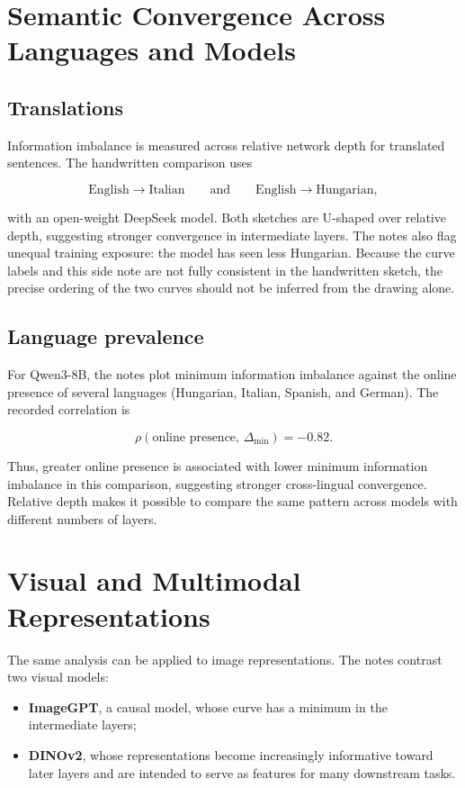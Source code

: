 \documentclass[11pt,a4paper]{article}
\begin{document}
\section{Semantic Convergence Across Languages and Models}

\subsection{Translations}

Information imbalance is measured across relative network depth for translated
sentences. The handwritten comparison uses

\[
  \text{English} \longrightarrow \text{Italian}
  \qquad\text{and}\qquad
  \text{English} \longrightarrow \text{Hungarian},
\]

with an open-weight DeepSeek model. Both sketches are U-shaped over relative
depth, suggesting stronger convergence in intermediate layers. The notes also
flag unequal training exposure: the model has seen less Hungarian. Because the
curve labels and this side note are not fully consistent in the handwritten
sketch, the precise ordering of the two curves should not be inferred from the
drawing alone.

\subsection{Language prevalence}

For Qwen3-8B, the notes plot minimum information imbalance against the online
presence of several languages (Hungarian, Italian, Spanish, and German). The
recorded correlation is

\[
  \rho\!\left(\text{online presence},\,\Delta_{\min}\right) = -0.82.
\]

Thus, greater online presence is associated with lower minimum information
imbalance in this comparison, suggesting stronger cross-lingual convergence.
Relative depth makes it possible to compare the same pattern across models with
different numbers of layers.

\section{Visual and Multimodal Representations}

The same analysis can be applied to image representations. The notes contrast
two visual models:

\begin{itemize}
  \item \textbf{ImageGPT}, a causal model, whose curve has a minimum in the
        intermediate layers;
  \item \textbf{DINOv2}, whose representations become increasingly informative
        toward later layers and are intended to serve as features for many
        downstream tasks.
\end{itemize}
\end{document}
